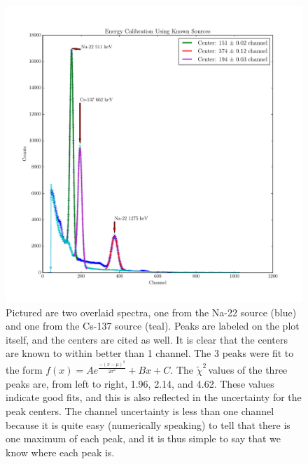 \documentclass{article}
\newcommand{\redchi}{$\tilde{\chi}^2\,$}
\begin{document}
  \begin{figure}[!htb]
    \centering
    \includegraphics[scale=.5]{../plots/calibration_peaks.pdf}
    \caption{Pictured are two overlaid spectra, one from the Na-22 source (blue) and one from the Cs-137 source (teal).  Peaks are labeled on the plot itself, and the centers are cited as well.  It is clear that the centers are known to within better than 1 channel.  The 3 peaks were fit to the form $f(x) = Ae^{\frac{-(x-\mu)^2}{2\sigma^2}} + Bx + C.$ The \redchi values of the three peaks are, from left to right, 1.96, 2.14, and 4.62.  These values indicate good fits, and this is also reflected in the uncertainty for the peak centers.  The channel uncertainty is less than one channel because it is quite easy (numerically speaking) to tell that there is one maximum of each peak, and it is thus simple to say that we know where each peak is.}
    \label{cal_peaks}
  \end{figure}
\end{document}
